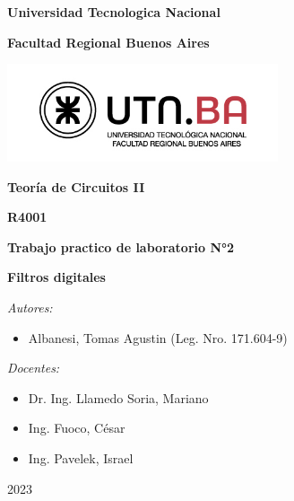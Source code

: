 \documentclass[main.tex]{subfiles}
\begin{document}
	
	\onecolumn
	
	\begin{center}
		
		\textbf{\fontsize{14}{\baselineskip}\selectfont Universidad Tecnologica Nacional}
		
		\bigskip
		
		\textbf{\fontsize{14}{\baselineskip}\selectfont Facultad Regional Buenos Aires}
		
		\bigskip
		
		\includegraphics[width=8cm]{utn-logo.jpg}
		
		\bigskip
		\bigskip
		
		\textbf{\fontsize{20}{\baselineskip}\selectfont Teoría de Circuitos II}
		
		\bigskip
		\bigskip
		
		\textbf{\fontsize{16}{\baselineskip}\selectfont R4001}
		
		\bigskip
		\bigskip
		
		\textbf{\fontsize{18}{\baselineskip}\selectfont Trabajo practico de laboratorio N°2}
		
		\bigskip
		
		\textbf{\fontsize{18}{\baselineskip}\selectfont Filtros digitales}
		
		\bigskip
		\bigskip
		\bigskip
		\bigskip
		\bigskip
		\bigskip
		
		\textit{\fontsize{14}{\baselineskip}\selectfont Autores:}
		
		\bigskip
		
		\begin{itemize}{}
			\item \fontsize{14}{\baselineskip}\selectfont Albanesi, Tomas Agustin (Leg. Nro. 171.604-9)
		\end{itemize}
		
		\bigskip
		\bigskip
		
		\textit{\fontsize{14}{\baselineskip}\selectfont Docentes:}
		
		\bigskip
		
		\begin{itemize}
			\item \fontsize{14}{\baselineskip}\selectfont Dr. Ing. Llamedo Soria, Mariano
			\item \fontsize{14}{\baselineskip}\selectfont Ing. Fuoco, César
			\item \fontsize{14}{\baselineskip}\selectfont Ing. Pavelek, Israel
		\end{itemize}
		
		\vspace{4cm}
		
		2023
		
	\end{center}
	
	\clearpage
	
\end{document}
